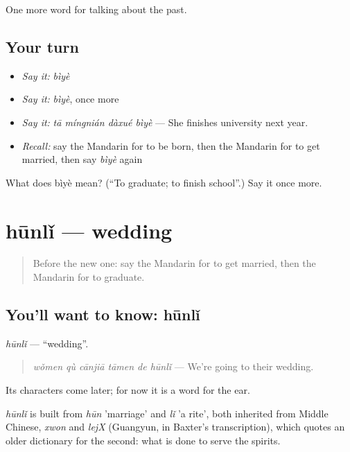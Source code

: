 \begin{grammarlens}[title={What you've built}]
One more word for talking about the past.
\end{grammarlens}

\subsection*{Your turn}
\begin{itemize}
\raggedright
  \item \emph{Say it:} \emph{bìyè}
  \item \emph{Say it:} \emph{bìyè}, once more
  \item \emph{Say it:} \emph{tā míngnián dàxué bìyè} — She finishes university next year.
  \item \emph{Recall:} say the Mandarin for to be born, then the Mandarin for to get married, then say \emph{bìyè} again
\end{itemize}

\begin{tcolorbox}[breakable,colback=teal!4,colframe=teal!35!black,title={Before you move on}]
What does bìyè mean? (\textquotedblleft{}To graduate; to finish school\textquotedblright{}.) Say it once more.
\end{tcolorbox}
\section[hūnlǐ]{hūnlǐ — wedding}

\label{lesson:ZH-C254-hunli}



\begin{quote}
Before the new one: say the Mandarin for to get married, then the Mandarin for to graduate.
\end{quote}

\subsection*{You'll want to know: hūnlǐ}
\emph{hūnlǐ} — \textquotedblleft{}wedding\textquotedblright{}.

\begin{quote}
\emph{wǒmen qù cānjiā tāmen de hūnlǐ} — We're going to their wedding.
\end{quote}

Its characters come later; for now it is a word for the ear.

\begin{cousinweb}
\emph{hūnlǐ} is built from \emph{hūn} 'marriage' and \emph{lǐ} 'a rite', both inherited from Middle Chinese, \emph{xwon} and \emph{lejX} (Guangyun, in Baxter's transcription), which quotes an older dictionary for the second: what is done to serve the spirits.
\end{cousinweb}


